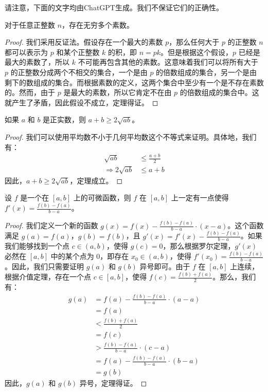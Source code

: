 请注意，下面的文字均由ChatGPT生成。我们不保证它们的正确性。

\begin{thm}
  对于任意正整数 $n$，存在无穷多个素数。
\end{thm}

\begin{proof}
  我们采用反证法。假设存在一个最大的素数 $p$，那么任何大于 $p$ 的正整数 $n$ 都可以表示为 $p$ 和某个正整数 $k$ 的积，即 $n = pk$。但是根据这个假设，$p$ 已经是最大的素数了，所以 $k$ 不可能再包含其他的素数。这意味着我们可以将所有大于 $p$ 的正整数分成两个不相交的集合，一个是由 $p$ 的倍数组成的集合，另一个是由剩下的数组成的集合。而根据素数的定义，这两个集合中至少有一个是不存在素数的。然而，由于 $p$ 是最大的素数，所以它肯定不在由 $p$ 的倍数组成的集合中。这就产生了矛盾，因此假设不成立，定理得证。
\end{proof}

\begin{cor}
  如果 $a$ 和 $b$ 是正实数，则 $a+b \geq 2\sqrt{ab}$。
\end{cor}

\begin{proof}
  我们可以使用平均数不小于几何平均数这个不等式来证明。具体地，我们有：
  \begin{align*}
    \sqrt{ab}              & \leq \frac{a+b}{2} \\
    \Rightarrow 2\sqrt{ab} & \leq a+b
  \end{align*}
  因此，$a+b \geq 2\sqrt{ab}$，定理成立。
\end{proof}

\begin{lem}
  设 $f$ 是一个在 $[a,b]$ 上的可微函数，则 $f$ 在 $[a,b]$ 上一定有一点使得 $f'(x) = \frac{f(b)-f(a)}{b-a}$。
\end{lem}

\begin{proof}
  我们定义一个新的函数 $g(x) = f(x) - \frac{f(b)-f(a)}{b-a} \cdot (x-a)$。这个函数满足 $g(a) = f(a)$，$g(b) = f(b)$，且 $g'(x) = f'(x) - \frac{f(b)-f(a)}{b-a}$。如果我们能够找到一个点 $c \in (a,b)$，使得 $g(c) = 0$，那么根据罗尔定理，$g'(x)$ 必然在 $[a,b]$ 中的某个点为 $0$，即存在 $x_0 \in (a,b)$，使得 $f'(x_0) = \frac{f(b)-f(a)}{b-a}$。因此，我们只需要证明 $g(a)$ 和 $g(b)$ 异号即可。由于 $f$ 在 $[a,b]$ 上连续，根据介值定理，存在一个点 $c \in [a,b]$，使得 $f(c) = \frac{f(b)+f(a)}{2}$。那么，我们有：
  \begin{align*}
    g(a) & = f(a) - \frac{f(b)-f(a)}{b-a} \cdot (a-a) \\
         & = f(a)                                     \\
         & < \frac{f(b)+f(a)}{2}                      \\
         & = f(c)                                     \\
         & > \frac{f(b)-f(a)}{b-a} \cdot (c-a)        \\
         & = f(a) - \frac{f(b)-f(a)}{b-a} \cdot (b-a) \\
         & = g(b)
  \end{align*}
  因此，$g(a)$ 和 $g(b)$ 异号，定理得证。
\end{proof}

